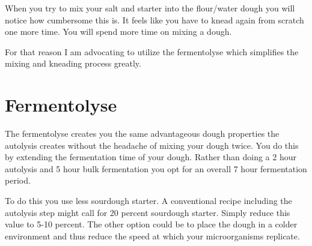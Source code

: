 When you try to mix your salt and starter into the flour/water dough you will
notice how cumbersome this is. It feels like you have to knead again from scratch
one more time. You will spend more time on mixing a dough.

For that reason I am advocating to utilize the fermentolyse which simplifies
the mixing and kneading process greatly.

\section{Fermentolyse}

The fermentolyse creates you the same advantageous dough properties the
autolysis creates without the headache of mixing your dough twice. You do this
by extending the fermentation time of your dough. Rather than doing a 2 hour
autolysis and 5 hour bulk fermentation you opt for an overall 7 hour
fermentation period.

To do this you use less sourdough starter. A conventional recipe including the
autolysis step might call for 20 percent sourdough starter. Simply reduce this
value to 5-10 percent. The other option could be to place the dough in a colder
environment and thus reduce the speed at which your microorganisms replicate.

